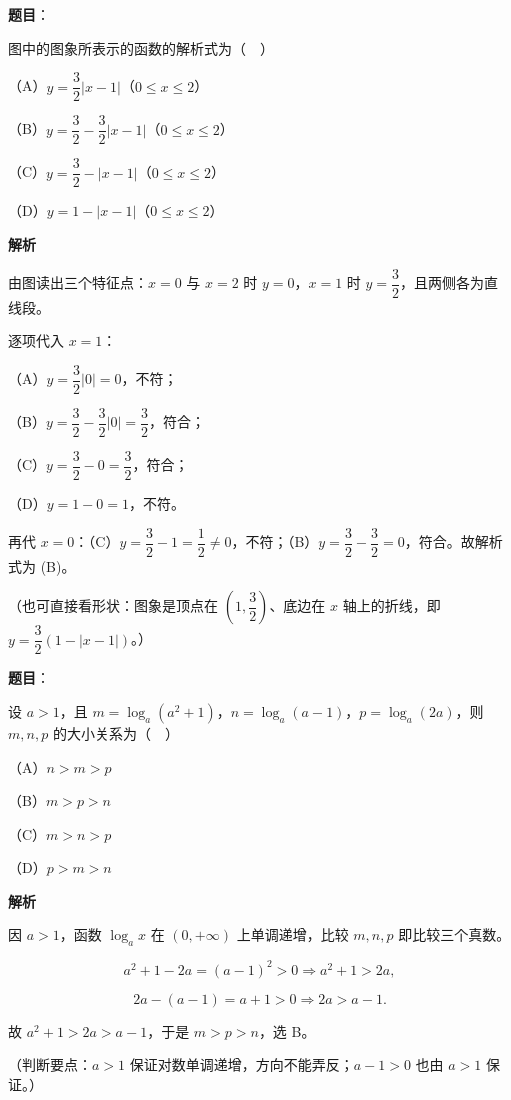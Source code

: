 \begin{answer}

\textbf{题目}：

图中的图象所表示的函数的解析式为（　）
\nopagebreak[4]
\begin{center}\end{center}
\nopagebreak[4]
（A）$y=\dfrac32|x-1|$（$0\leqslant x\leqslant2$）

（B）$y=\dfrac32-\dfrac32|x-1|$（$0\leqslant x\leqslant2$）

（C）$y=\dfrac32-|x-1|$（$0\leqslant x\leqslant2$）

（D）$y=1-|x-1|$（$0\leqslant x\leqslant2$）

\textbf{解析}

由图读出三个特征点：$x=0$ 与 $x=2$ 时 $y=0$，$x=1$ 时 $y=\dfrac32$，且两侧各为直线段。

逐项代入 $x=1$：

（A）$y=\dfrac32|0|=0$，不符；

（B）$y=\dfrac32-\dfrac32|0|=\dfrac32$，符合；

（C）$y=\dfrac32-0=\dfrac32$，符合；

（D）$y=1-0=1$，不符。

再代 $x=0$：（C）$y=\dfrac32-1=\dfrac12\neq0$，不符；（B）$y=\dfrac32-\dfrac32=0$，符合。故解析式为 (B)。

（也可直接看形状：图象是顶点在 $\left(1,\dfrac32\right)$、底边在 $x$ 轴上的折线，即 $y=\dfrac32\left(1-|x-1|\right)$。）


\end{answer}
\begin{answer}

\textbf{题目}：

设 $a>1$，且 $m=\log_a(a^2+1)$，$n=\log_a(a-1)$，$p=\log_a(2a)$，则 $m,n,p$ 的大小关系为（　）

（A）$n>m>p$

（B）$m>p>n$

（C）$m>n>p$

（D）$p>m>n$

\textbf{解析}

因 $a>1$，函数 $\log_a x$ 在 $(0,+\infty)$ 上单调递增，比较 $m,n,p$ 即比较三个真数。

\nopagebreak[4]
\[a^2+1-2a=(a-1)^2>0\Longrightarrow a^2+1>2a,\]

\nopagebreak[4]
\[2a-(a-1)=a+1>0\Longrightarrow 2a>a-1.\]

故 $a^2+1>2a>a-1$，于是 $m>p>n$，选 B。

（判断要点：$a>1$ 保证对数单调递增，方向不能弄反；$a-1>0$ 也由 $a>1$ 保证。）


\end{answer}
